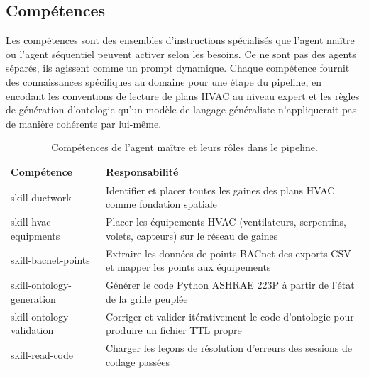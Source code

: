 \subsection{Compétences}
\label{subsec:skills}

Les compétences sont des ensembles d'instructions spécialisés que l'agent maître ou l'agent séquentiel
peuvent activer selon les besoins.
Ce ne sont pas des agents séparés, ils agissent comme un prompt dynamique.
Chaque compétence fournit des connaissances spécifiques au domaine pour une étape du pipeline, en
encodant les conventions de lecture de plans HVAC au niveau expert et les règles de génération d'ontologie
qu'un modèle de langage généraliste n'appliquerait pas de manière cohérente par lui-même.

\begin{table}[htbp]
  \caption{Compétences de l'agent maître et leurs rôles dans le pipeline.}
  \label{tab:skills}
  \centering
  \begin{tabular}{ll}
    \toprule
    \textbf{Compétence} & \textbf{Responsabilité} \\
    \midrule
    skill-ductwork            & Identifier et placer toutes les gaines des plans HVAC comme fondation spatiale \\
    skill-hvac-equipments     & Placer les équipements HVAC (ventilateurs, serpentins, volets, capteurs) sur le réseau de gaines \\
    skill-bacnet-points       & Extraire les données de points BACnet des exports CSV et mapper les points aux équipements \\
    skill-ontology-generation & Générer le code Python ASHRAE 223P à partir de l'état de la grille peuplée \\
    skill-ontology-validation & Corriger et valider itérativement le code d'ontologie pour produire un fichier TTL propre \\
    skill-read-code           & Charger les leçons de résolution d'erreurs des sessions de codage passées \\
    \bottomrule
  \end{tabular}
\end{table}

